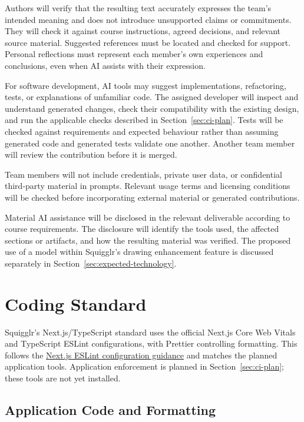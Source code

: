 \documentclass{article}
\begin{document}
Authors will verify that the resulting text accurately expresses
the team's intended meaning and does not introduce unsupported
claims or commitments. They will check it against course
instructions, agreed decisions, and relevant source material.
Suggested references must be located and checked for support.
Personal reflections must represent each member's own experiences
and conclusions, even when AI assists with their expression.

For software development, AI tools may suggest implementations,
refactoring, tests, or explanations of unfamiliar code. The assigned
developer will inspect and understand generated changes, check their
compatibility with the existing design, and run the applicable checks
described in Section~\ref{sec:ci-plan}. Tests will be checked against
requirements and expected behaviour rather than assuming generated
code and generated tests validate one another. Another team member
will review the contribution before it is merged.

Team members will not include credentials, private user data, or
confidential third-party material in prompts. Relevant usage terms
and licensing conditions will be checked before incorporating
external material or generated contributions.

Material AI assistance will be disclosed in the relevant deliverable
according to course requirements. The disclosure will identify the
tools used, the affected sections or artifacts, and how the resulting
material was verified. The proposed use of a model within Squigglr's
drawing enhancement feature is discussed separately in
Section~\ref{sec:expected-technology}.

\section{Coding Standard}

Squigglr's Next.js/TypeScript standard uses the official Next.js Core Web
Vitals and TypeScript ESLint configurations, with Prettier controlling
formatting. This follows the
\href{https://nextjs.org/docs/app/api-reference/config/eslint}
{Next.js ESLint configuration guidance} and matches the planned application
tools. Application enforcement is planned in Section~\ref{sec:ci-plan};
these tools are not yet installed.

\subsection{Application Code and Formatting}
\end{document}
